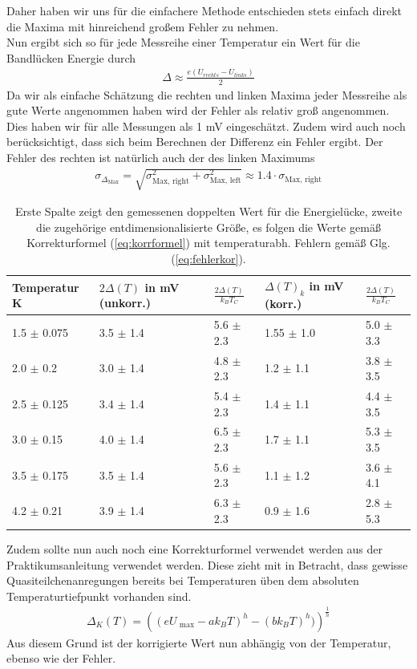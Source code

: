 \documentclass[twoside,        %
               BCOR12mm,       %
               english,ngerman, %
               fleqn,headsepline=false,footsepline=false
              ]{MFPREPORT}
\begin{document}
Daher haben wir uns für die einfachere Methode entschieden stets einfach direkt die Maxima mit hinreichend großem Fehler zu nehmen.
\\
Nun ergibt sich so für jede Messreihe einer 
Temperatur ein Wert für die Bandlücken Energie durch
\begin{align}
\Delta \approx \frac{e(U_{rechts}-U_{links})}{2}
\end{align}
Da wir als einfache Schätzung die rechten und linken Maxima jeder Messreihe
als gute Werte angenommen haben wird der Fehler als relativ groß
angenommen.
Dies haben wir für alle Messungen als 1 mV eingeschätzt.
Zudem wird auch noch berücksichtigt, dass sich beim Berechnen der Differenz ein Fehler ergibt.
Der Fehler des rechten ist natürlich auch der des linken Maximums
\begin{align}
\sigma_{\Delta_{\text{Max}}} = \sqrt{\sigma_{\text{Max, right}}^2 + \sigma_{\text{Max, left}}^2} \approx 
1.4 \cdot \sigma_{\text{Max, right}}
\end{align}

\begin{table}[]
\centering
\caption{Erste Spalte zeigt den gemessenen doppelten Wert für die Energielücke,
zweite die zugehörige entdimensionalisierte Größe, es folgen die Werte gemäß Korrekturformel
(\ref{eq:korrformel}) mit temperaturabh. Fehlern gemäß Glg. (\ref{eq:fehlerkor}). }
\label{my-label}
\begin{tabular}{|l|l|l|l|l|}
\hline
Temperatur K & $ 2 \Delta(T)$ in mV  (unkorr.)    & $\frac{2\Delta (T)}{k_{B} T_{C}}$ & $\Delta (T)_{k}$  in mV  (korr.)                              & $\frac{2\Delta (T)}{k_{B} T_{C}}$         \\ \hline
1.5  $\pm$ 0.075        & 3.5 $\pm$ 1.4 & 5.6 $\pm$ 2.3      & 1.55 $\pm$ 1.0  & 5.0 $\pm$ 3.3  \\ \hline
2.0 $\pm$ 0.2         & 3.0 $\pm$ 1.4 & 4.8 $\pm$ 2.3          & 1.2 $\pm$  1.1 & 3.8 $\pm$ 3.5 \\ \hline
2.5     $\pm$ 0.125     & 3.4 $\pm$ 1.4 & 5.4 $\pm$ 2.3           & 1.4 $\pm$ 1.1 & 4.4 $\pm$ 3.5  \\ \hline
3.0   $\pm$ 0.15       & 4.0 $\pm$ 1.4 & 6.5 $\pm$ 2.3  & 1.7 $\pm$ 1.1  & 5.3 $\pm$ 3.5  \\ \hline
3.5   $\pm$ 0.175       & 3.5 $\pm$ 1.4 & 5.6 $\pm$ 2.3  & 1.1 $\pm$ 1.2  & 3.6 $\pm$  4.1   \\ \hline
4.2  $\pm$  0.21       & 3.9 $\pm$ 1.4 & 6.3 $\pm$ 2.3  & 0.9 $\pm$ 1.6  & 2.8 $\pm$ 5.3   \\ \hline
\end{tabular}
\label{tab:results}
\end{table}
Zudem sollte nun auch noch eine Korrekturformel verwendet werden aus der Praktikumsanleitung verwendet werden.
Diese zieht mit in Betracht, dass gewisse Quasiteilchenanregungen bereits bei Temperaturen üben dem absoluten Temperaturtiefpunkt vorhanden sind.
\begin{align}
\Delta_{K} (T) = \left( (e U_{\text{ max}} -a k_{B} T)^h -(b k_{B} T)^h) \right)^{\frac{1}{h}}
\end{align}
Aus diesem Grund ist der korrigierte Wert nun abhängig von der Temperatur, ebenso wie der Fehler.
\end{document}
